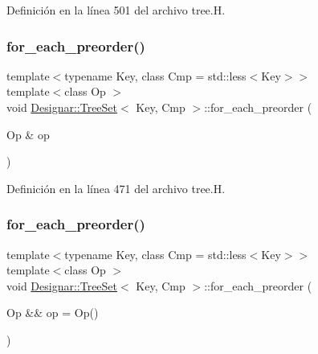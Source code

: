 Definición en la línea 501 del archivo tree.\+H.

\mbox{\label{class_designar_1_1_tree_set_ae464b1e41281166a0beda95787f6f303}} 
\subsubsection{\texorpdfstring{for\+\_\+each\+\_\+preorder()}{for\_each\_preorder()}\hspace{0.1cm}{\footnotesize\ttfamily [1/2]}}
{\footnotesize\ttfamily template$<$typename Key, class Cmp = std\+::less$<$\+Key$>$$>$ \\
template$<$class Op $>$ \\
void \hyperlink{class_designar_1_1_tree_set}{Designar\+::\+Tree\+Set}$<$ Key, Cmp $>$\+::for\+\_\+each\+\_\+preorder (\begin{DoxyParamCaption}\item[{Op \&}]{op }\end{DoxyParamCaption})\hspace{0.3cm}{\ttfamily [inline]}}



Definición en la línea 471 del archivo tree.\+H.

\mbox{\label{class_designar_1_1_tree_set_a45484640b06b18673646c606cf278e08}} 
\subsubsection{\texorpdfstring{for\+\_\+each\+\_\+preorder()}{for\_each\_preorder()}\hspace{0.1cm}{\footnotesize\ttfamily [2/2]}}
{\footnotesize\ttfamily template$<$typename Key, class Cmp = std\+::less$<$\+Key$>$$>$ \\
template$<$class Op $>$ \\
void \hyperlink{class_designar_1_1_tree_set}{Designar\+::\+Tree\+Set}$<$ Key, Cmp $>$\+::for\+\_\+each\+\_\+preorder (\begin{DoxyParamCaption}\item[{Op \&\&}]{op = {\ttfamily Op()} }\end{DoxyParamCaption})\hspace{0.3cm}{\ttfamily [inline]}}



